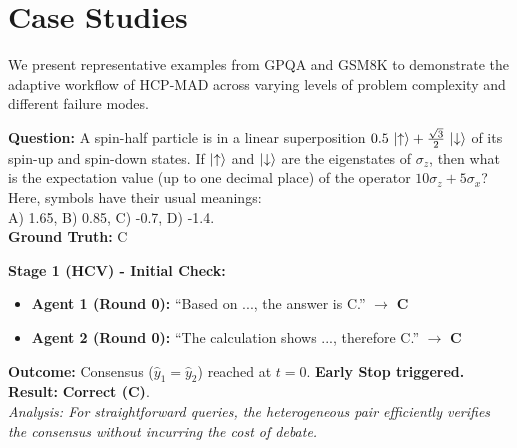 \documentclass[11pt]{article}
\begin{document}
\section{Case Studies}
\label{sec:appendix_cases}
We present representative examples from GPQA and GSM8K to demonstrate the adaptive workflow of HCP-MAD across varying levels of problem complexity and different failure modes.

\begin{tcolorbox}[
    enhanced, breakable, width=\linewidth,
    colback=green!5, colframe=green!40!black, %
    title=\textbf{Case 1: Early Consensus (Easy Task) - GPQA ID 2},
    fonttitle=\bfseries\small
]
\textbf{Question:}
A spin-half particle is in a linear superposition
$0.5\,\ket{\uparrow}+\frac{\sqrt{3}}{2}\,\ket{\downarrow}$
of its spin-up and spin-down states.
If $\ket{\uparrow}$ and $\ket{\downarrow}$ are the eigenstates of $\sigma_{z}$,
then what is the expectation value (up to one decimal place) of the operator
$10\sigma_{z}+5\sigma_{x}$?
Here, symbols have their usual meanings:\\
A) 1.65, B) 0.85, C) -0.7, D) -1.4.\\
\textbf{Ground Truth:} C

\vspace{4pt}
\textbf{Stage 1 (HCV) - Initial Check:}
\begin{itemize}[leftmargin=1.5em, nosep]
    \item \textbf{Agent 1 (Round 0):} ``Based on ..., the answer is C.'' $\to$ \textbf{C}
    \item \textbf{Agent 2 (Round 0):} ``The calculation shows ..., therefore C.'' $\to$ \textbf{C}
\end{itemize}

\vspace{4pt}
\textbf{Outcome:} Consensus ($\hat{y}_1 = \hat{y}_2$) reached at $t=0$. \textbf{Early Stop triggered.} \\
\textbf{Result:} \textcolor{green!60!black}{\textbf{Correct (C)}}. \\
\textit{Analysis: For straightforward queries, the heterogeneous pair efficiently verifies the consensus without incurring the cost of debate.}
\end{tcolorbox}

\vspace{10pt}
\end{document}
